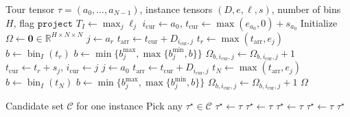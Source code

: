 \begin{algorithm}[t]
\caption{\textsc{MaterializeOccupancy}}
\label{alg:occ-materialize}
\begin{algorithmic}[1]
\REQUIRE Tour tensor $\tau=(a_0,\ldots,a_{N-1})$, instance tensors $(D,e,\ell,s)$, number of bins $H$, flag $\texttt{project}$
\STATE $T_I \leftarrow \max_j \ell_j$
\STATE $i_{\mathrm{cur}} \leftarrow a_0$, $t_{\mathrm{cur}} \leftarrow \max(e_{a_0},0)+s_{a_0}$
\STATE Initialize $\Omega \leftarrow \mathbf{0}\in\mathbb{R}^{H\times N\times N}$
    \STATE $j \leftarrow a_r$
    \STATE $t_{\mathrm{arr}} \leftarrow t_{\mathrm{cur}} + D_{i_{\mathrm{cur}},j}$
    \STATE $t_r \leftarrow \max(t_{\mathrm{arr}},e_j)$
    \STATE $b \leftarrow \operatorname{bin}_I(t_r)$
        \STATE $b \leftarrow \min\{b_j^{\max},\max\{b_j^{\min},b\}\}$
    \ENDIF
    \STATE $\Omega_{b,i_{\mathrm{cur}},j} \leftarrow \Omega_{b,i_{\mathrm{cur}},j}+1$
    \STATE $t_{\mathrm{cur}} \leftarrow t_r + s_j$, $i_{\mathrm{cur}} \leftarrow j$
\ENDFOR
\STATE $j \leftarrow a_0$
\STATE $t_{\mathrm{arr}} \leftarrow t_{\mathrm{cur}} + D_{i_{\mathrm{cur}},j}$
\STATE $t_N \leftarrow \max(t_{\mathrm{arr}},e_j)$
\STATE $b \leftarrow \operatorname{bin}_I(t_N)$
    \STATE $b \leftarrow \min\{b_j^{\max},\max\{b_j^{\min},b\}\}$
\ENDIF
\STATE $\Omega_{b,i_{\mathrm{cur}},j} \leftarrow \Omega_{b,i_{\mathrm{cur}},j}+1$
\STATE \RETURN $\Omega$
\end{algorithmic}
\end{algorithm}

\begin{algorithm}[t]
\caption{\textsc{SelectBest}}
\label{alg:occ-select-best}
\begin{algorithmic}[1]
\REQUIRE Candidate set $\mathcal{C}$ for one instance
\STATE Pick any $\tau^\star\in\mathcal{C}$
        \STATE $\tau^\star\leftarrow\tau$
        \STATE $\tau^\star\leftarrow\tau$
        \STATE $\tau^\star\leftarrow\tau$
        \STATE $\tau^\star\leftarrow\tau$
    \ENDIF
\ENDFOR
\STATE \RETURN $\tau^\star$
\end{algorithmic}
\end{algorithm}

